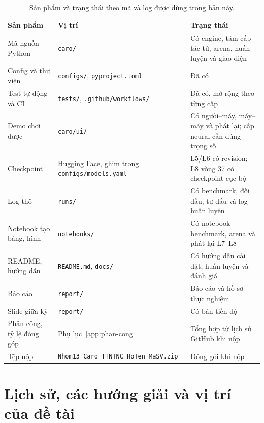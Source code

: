 \begin{table}[!htb]
  \centering\small
  \caption{Sản phẩm và trạng thái theo mã và log được dùng trong bản này.}
  \label{tab:gt-san-pham}
  \begin{tabularx}{\textwidth}{@{}>{\raggedright\arraybackslash}p{} >{\raggedright\arraybackslash}p{} >{\raggedright\arraybackslash}X@{}}
    \toprule
    \textbf{Sản phẩm} & \textbf{Vị trí} & \textbf{Trạng thái} \\
    \midrule
    Mã nguồn Python & \texttt{caro/} & Có engine, tám cấp tác tử, arena, huấn luyện và giao diện \\
    Config và thư viện & \texttt{configs/}, \texttt{pyproject.toml} & Đã có \\
    Test tự động và CI & \texttt{tests/}, \texttt{.github/workflows/} & Đã có, mở rộng theo từng cấp \\
    Demo chơi được & \texttt{caro/ui/} & Có người--máy, máy--máy và phát lại; cấp neural cần đúng trọng số \\
    Checkpoint & Hugging Face, ghim trong \texttt{configs/models.yaml} & L5/L6 có revision; L8 vòng 37 có checkpoint cục bộ \\
    Log thô & \texttt{runs/} & Có benchmark, đối đầu, tự đấu và log huấn luyện \\
    Notebook tạo bảng, hình & \texttt{notebooks/} & Có notebook benchmark, arena và phát lại L7--L8 \\
    README, hướng dẫn & \texttt{README.md}, \texttt{docs/} & Có hướng dẫn cài đặt, huấn luyện và đánh giá \\
    Báo cáo & \texttt{report/} & Báo cáo và hồ sơ thực nghiệm \\
    Slide giữa kỳ & \texttt{report/} & Có bản tiến độ \\
    Phân công, tỷ lệ đóng góp & Phụ lục~\ref{app:phan-cong} & Tổng hợp từ lịch sử GitHub khi nộp \\
    Tệp nộp & \texttt{Nhom13\_Caro\_TTNTNC\_HoTen\_MaSV.zip} & Đóng gói khi nộp \\
    \bottomrule
  \end{tabularx}
\end{table}

\section{Lịch sử, các hướng giải và vị trí của đề tài}
\label{sec:gt-lich-su}

